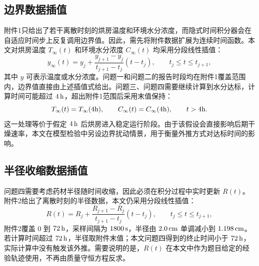 \documentclass[UTF8,a4paper,12pt]{ctexart}
\begin{document}
\subsection{边界数据插值}
附件1只给出了若干离散时刻的烘房温度和环境水分浓度，而隐式时间积分器会在自适应时间步上反复调用边界值。因此，需先将附件数据扩展为连续时间函数。本文对烘房温度 $T_\infty(t)$ 和环境水分浓度 $C_\infty(t)$ 均采用分段线性插值：
\begin{equation}
  y_\infty(t)=y_j+\frac{y_{j+1}-y_j}{t_{j+1}-t_j}(t-t_j),
  \qquad t_j\le t\le t_{j+1},
\end{equation}
其中 $y$ 可表示温度或水分浓度。问题一和问题二的报告时段均在附件1覆盖范围内，边界值直接由上述插值式给出。问题三、问题四需要继续计算到水分达标，计算时间可能超过 $4\rm\,h$，超出附件1范围后采用末值保持：
\begin{equation}
  T_\infty(t)=T_\infty(4{\rm h}),\qquad C_\infty(t)=C_\infty(4{\rm h}),\qquad t>4{\rm h}.
\end{equation}
这一处理等价于假定 $4\rm\,h$ 后烘房进入稳定运行阶段。由于该假设会直接影响后期干燥速率，本文在模型检验中另设边界扰动情景，用于衡量外推方式对达标时间的影响。

\subsection{半径收缩数据插值}
问题四需要考虑药材半径随时间收缩，因此必须在积分过程中实时更新 $R(t)$。附件2给出了离散时刻的半径数据，本文仍采用分段线性插值：
\begin{equation}
  R(t)=R_j+\frac{R_{j+1}-R_j}{t_{j+1}-t_j}(t-t_j),
  \qquad t_j\le t\le t_{j+1},
\end{equation}
附件2覆盖 $0$ 到 $72\rm\,h$，采样间隔为 $1800\rm\,s$，半径由 $2.0\rm\,cm$ 单调减小到 $1.198\rm\,cm$。若计算时间超过 $72\rm\,h$，半径取附件末值；本文问题四得到的终止时间小于 $72\rm\,h$，实际计算中没有触发该外推。需要说明的是，$R(t)$ 在本文中作为题目给定的经验轨迹使用，不再由质量守恒方程反求。
\end{document}
